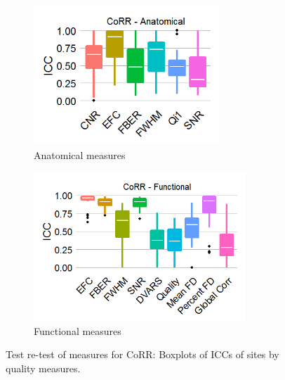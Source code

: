 \documentclass{frontiersSCNS} %
\begin{document}
\begin{figure}[!ht]
  \centering
     \begin{subfigure}[b]{0.4\textwidth}
       \includegraphics[width=7cm]{fig3_corr_anat_icc_btw}
       \caption{Anatomical measures}
     \end{subfigure}
     \begin{subfigure}[b]{0.4\textwidth}
       \includegraphics[width=8cm]{fig3_corr_func_icc_btw}
       \caption{Functional measures}
     \end{subfigure} 
     \caption{Test re-test of measures for CoRR: Boxplots of ICCs of sites by quality measures.}
\end{figure}
\end{document}
